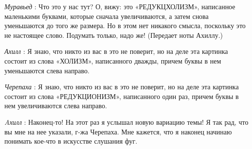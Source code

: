 \documentclass[../main.tex]{subfiles}
\begin{document}
\begin{dialogue}
\emph{Муравьед} : Что это у нас тут? О, вижу: это «РЕДУКЦХОЛИЗМ», написанное маленькими буквами, которые сначала увеличиваются, а затем снова уменьшаются до того же размера. Но в этом нет никакого смысла, поскольку это не настоящее слово. Подумать только, надо же! (Передает ноты Ахиллу.)

\emph{Ахилл} : Я знаю, что никто из вас в это не поверит, но на деле эта картинка состоит из слова «ХОЛИЗМ», написанного дважды, причем буквы в нем уменьшаются слева направо.

\emph{Черепаха} : Я знаю, что никто из вас в это не поверит, но на деле эта картинка состоит из слова «РЕДУКЦИОНИЗМ», написанного один раз, причем буквы в нем увеличиваются слева направо.

\emph{Aхилл} : Наконец-то! На этот раз я услышал новую вариацию темы! Я так рад, что вы мне на нее указали, г-жа Черепаха. Мне кажется, что я наконец начинаю понимать кое-что в искусстве слушания фуг.

\end{dialogue}
\end{document}
